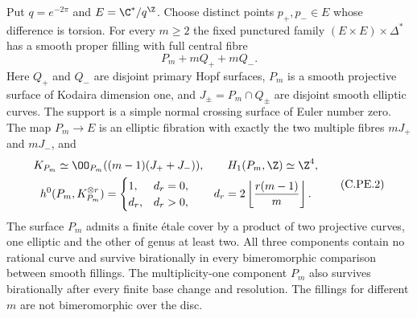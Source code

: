\begin{proposition}\label{cdp:st:C.2.UN.18}

Put $q=e^{-2\pi}$ and $E=\C^*/q^{\Z}$. Choose distinct
points $p_+,p_-\in E$ whose difference is torsion.
For every $m\ge2$ the fixed punctured family
$(E\times E)\times\Delta^*$ has a smooth proper filling
with full central fibre
\[
                         P_m+mQ_++mQ_-.                 \tag{C.PE.1}\label{cdp:eq:C.PE.1}
\]
Here $Q_+$ and $Q_-$ are disjoint primary Hopf surfaces,
$P_m$ is a smooth projective surface of Kodaira dimension
one, and $J_\pm=P_m\cap Q_\pm$ are disjoint smooth
elliptic curves. The support is a simple normal crossing
surface of Euler number zero. The map $P_m\to E$ is an
elliptic fibration with exactly the two multiple fibres
$mJ_+$ and $mJ_-$, and
\[
 \begin{gathered}
 K_{P_m}\simeq\OO_{P_m}((m-1)(J_++J_-)),\qquad
 H_1(P_m,\Z)\simeq\Z^4,\\
 h^0(P_m,K_{P_m}^{\otimes r})=
 \begin{cases}1,&d_r=0,\\d_r,&d_r>0,\end{cases}
 \qquad d_r=2\left\lfloor\frac{r(m-1)}m\right\rfloor.
 \end{gathered}                                         \tag{C.PE.2}\label{cdp:eq:C.PE.2}
\]
The surface $P_m$ admits a finite \'etale cover by a
product of two projective curves, one elliptic and the
other of genus at least two. All three components contain
no rational curve and survive birationally in every
bimeromorphic comparison between smooth fillings. The
multiplicity-one component $P_m$ also survives birationally
after every finite base change and resolution. The
fillings for different $m$ are not bimeromorphic over the
disc.


\end{proposition}
